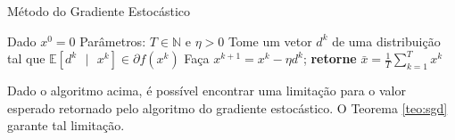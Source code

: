 \documentclass[
	12pt,				%
    oneside,			%
	a4paper,			%
	english,			%
	french,				%
	spanish,			%
	brazil,				%
	]{abntex2}
\begin{document}
            \begin{algorithm}
                \caption{Método do Gradiente Estocástico}
                \begin{algorithmic}[1]
                    \State Dado $x^0 = 0$
                    \State Parâmetros: $T \in \mathbb{N}$ e $\eta > 0$
                        \State Tome um vetor $d^k$ de uma distribuição tal que $\mathbb{E}[d^k\mbox{ }\vert\mbox{ } x^k] \in \partial f(x^k)$
                        \State Faça $x^{k+1} = x^k - \eta d^k$;
                    \EndFor
                    \State \textbf{retorne} $\bar{x} = \frac{1}{T}\sum_{k=1}^{T} x^k$
                \end{algorithmic}
            \end{algorithm}

            Dado o algoritmo acima, é possível encontrar uma limitação para o valor esperado retornado pelo algoritmo do gradiente estocástico. O Teorema \ref{teo:sgd} garante tal limitação.
\end{document}
